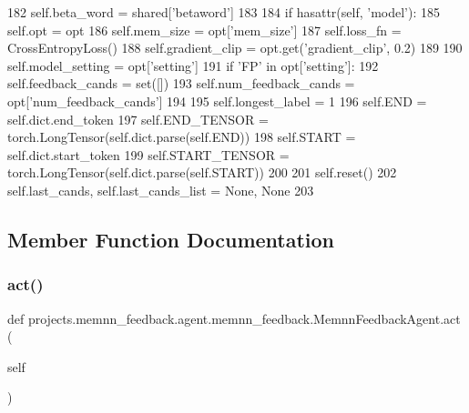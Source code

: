 \begin{DoxyCode}
182                     self.beta\_word = shared[\textcolor{stringliteral}{'betaword'}]
183 
184         \textcolor{keywordflow}{if} hasattr(self, \textcolor{stringliteral}{'model'}):
185             self.opt = opt
186             self.mem\_size = opt[\textcolor{stringliteral}{'mem\_size'}]
187             self.loss\_fn = CrossEntropyLoss()
188             self.gradient\_clip = opt.get(\textcolor{stringliteral}{'gradient\_clip'}, 0.2)
189 
190             self.model\_setting = opt[\textcolor{stringliteral}{'setting'}]
191             \textcolor{keywordflow}{if} \textcolor{stringliteral}{'FP'} \textcolor{keywordflow}{in} opt[\textcolor{stringliteral}{'setting'}]:
192                 self.feedback\_cands = set([])
193                 self.num\_feedback\_cands = opt[\textcolor{stringliteral}{'num\_feedback\_cands'}]
194 
195             self.longest\_label = 1
196             self.END = self.dict.end\_token
197             self.END\_TENSOR = torch.LongTensor(self.dict.parse(self.END))
198             self.START = self.dict.start\_token
199             self.START\_TENSOR = torch.LongTensor(self.dict.parse(self.START))
200 
201         self.reset()
202         self.last\_cands, self.last\_cands\_list = \textcolor{keywordtype}{None}, \textcolor{keywordtype}{None}
203 
\end{DoxyCode}


\subsection{Member Function Documentation}
\mbox{\label{classprojects_1_1memnn__feedback_1_1agent_1_1memnn__feedback_1_1MemnnFeedbackAgent_ac5b3aecbd5c3b8e5cd4771d892274e7b}} 
\subsubsection{\texorpdfstring{act()}{act()}}
{\footnotesize\ttfamily def projects.\+memnn\+\_\+feedback.\+agent.\+memnn\+\_\+feedback.\+Memnn\+Feedback\+Agent.\+act (\begin{DoxyParamCaption}\item[{}]{self }\end{DoxyParamCaption})}



